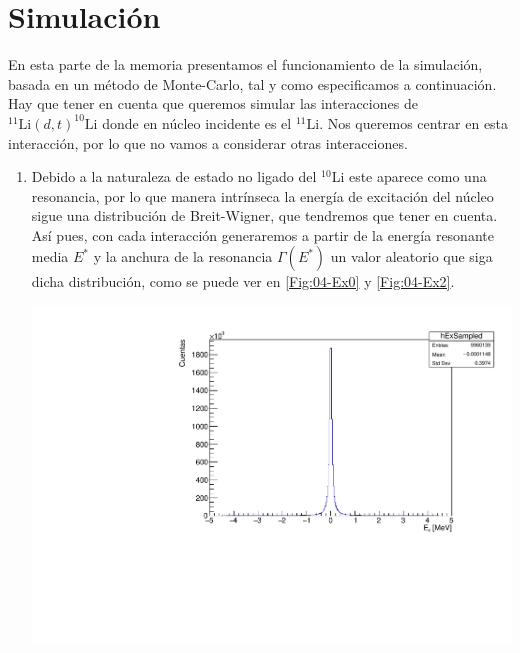 \section{Simulación }

En esta parte de la memoria presentamos el funcionamiento de la simulación, basada en un método de Monte-Carlo, tal y como especificamos a continuación. Hay que tener en cuenta que queremos simular las interacciones de $^{11}\text{Li}(d,t)^{10}\text{Li}$ donde en núcleo incidente es el $^{11}\text{Li}$. Nos queremos centrar en esta interacción, por lo que no vamos a considerar otras interacciones.

\begin{enumerate}

    \item  Debido a la naturaleza de estado no ligado del $^{10}$Li este aparece como una resonancia, por lo que manera intrínseca la energía de excitación del núcleo sigue una distribución de Breit-Wigner, que tendremos que tener en cuenta. Así pues, con cada interacción generaremos a partir de la energía resonante media $E^*$ y la anchura de la resonancia $\Gamma(E^*)$ un valor aleatorio que siga dicha distribución, como se puede ver en \cref{Fig:04-Ex0} y \cref{Fig:04-Ex2}.
    

    \begin{minipage}{0.45\linewidth} \centering
        \includegraphics[width=1\linewidth]{Imagenes/ExSampled_Ex0.00_incIdx0.pdf} 


\end{minipage}
\end{enumerate}
